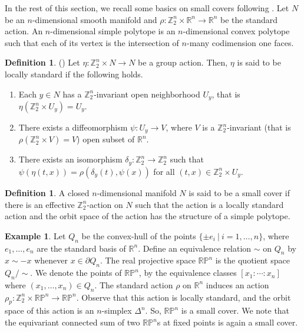 \documentclass[11pt]{amsart}
\numberwithin{equation}{section}
\theoremstyle{definition}
\newtheorem{defn}[theorem]{Definition}
\newtheorem{example}[theorem]{Example}
\def \bb{\mathbb}
\def \RR{{\bb{R}}}
\def \ZZ{{\bb{Z}}}
\begin{document}

In the rest of this section, we recall some basics on small covers following \cite{DJ}. Let $N$ be an $n$-dimensional smooth manifold and $\rho \colon \ZZ_2^n \times \RR^n \to \RR^n$ be the standard action. An $n$-dimensional simple polytope is an $n$-dimensional convex polytope such that each of its vertex is the intersection of $n$-many codimension one faces. 
\begin{defn} (\cite{DJ})
Let $\eta \colon \ZZ_2^n \times N \to N$ be a group action. Then, $\eta$ is said to be locally standard if the following holds.
\begin{enumerate}
 \item Each $y \in N $ has a $\ZZ_2^n$-invariant open neighborhood $U_y$, that is $\eta (\ZZ_2^n \times U_y) = U_y$.
\item  There exists a diffeomorphism $\psi \colon U_y \to V$, where $V$ is a $\ZZ_2^n$-invariant (that is $\rho (\ZZ_2^n \times V) = V$) open subset of $\RR^n$.
\item There exists an isomorphism $\delta_y \colon \ZZ_2^n \to \ZZ_2^n$ such that $\psi( \eta (t, x)) = \rho(\delta_y (t), \psi(x))$ for all $(t,x) \in \ZZ_2^n \times U_y$.
\end{enumerate}
\end{defn}

\begin{defn}\cite{DJ}
A closed $n$-dimensional manifold $N$ is said to be a small cover if
there is an effective $\ZZ^n_2$-action on $N$ such that the action is a locally standard action and the orbit space of the action has the structure of a simple polytope. 
\end{defn}

\begin{example}
Let $Q_n $ be the convex-hull of the points $\{\pm e_i ~|~ i=1, \ldots, n\}$, where $e_1, \ldots, e_n$ are the standard basis of $\RR^n$. Define an equivalence relation $\sim$ on $Q_n$ by $x \sim -x$ whenever $x \in \partial Q_n$. The real projective space $\mathbb{RP}^n$ is the quotient space $Q_n/\sim $. We denote the points of $\mathbb{RP}^n$, by the equivalence classes $[x_1: \cdots : x_{n}]$ where $(x_1, \ldots, x_{n}) \in Q_n$. The standard action $\rho$ on $\RR^n$ induces an action $\rho_p \colon \ZZ_2^n \times \mathbb{RP}^n \to \mathbb{RP}^n$. Observe that this action is locally standard, and the orbit space of this action is an $n$-simplex $\Delta^n$. So, $\mathbb{RP}^n$ is a small cover. We note that 
the equivariant connected sum of two $\mathbb{RP}^n$s at fixed points is again a small cover.
\end{example}
\end{document}
